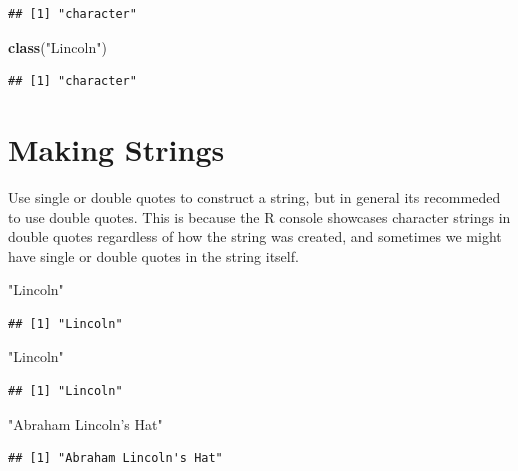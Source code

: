 \documentclass[
]{book}
\newenvironment{Shaded}{\begin{snugshade}}{\end{snugshade}}
\newcommand{\KeywordTok}[1]{\textcolor[rgb]{0.13,0.29,0.53}{\textbf{#1}}}
\newcommand{\NormalTok}[1]{#1}
\newcommand{\StringTok}[1]{\textcolor[rgb]{0.31,0.60,0.02}{#1}}
\begin{document}
\begin{verbatim}
## [1] "character"
\end{verbatim}

\begin{Shaded}
\begin{Highlighting}[]
\KeywordTok{class}\NormalTok{(}\StringTok{"Lincoln"}\NormalTok{)}
\end{Highlighting}
\end{Shaded}

\begin{verbatim}
## [1] "character"
\end{verbatim}

\hypertarget{making-strings}{%
\section{Making Strings}\label{making-strings}}

Use single or double quotes to construct a string, but in general its recommeded to use double quotes. This is because the R console showcases character strings in double quotes regardless of how the string was created, and sometimes we might have single or double quotes in the string itself.

\begin{Shaded}
\begin{Highlighting}[]
\StringTok{"Lincoln"}
\end{Highlighting}
\end{Shaded}

\begin{verbatim}
## [1] "Lincoln"
\end{verbatim}

\begin{Shaded}
\begin{Highlighting}[]
\StringTok{"Lincoln"}
\end{Highlighting}
\end{Shaded}

\begin{verbatim}
## [1] "Lincoln"
\end{verbatim}

\begin{Shaded}
\begin{Highlighting}[]
\StringTok{"Abraham Lincoln's Hat"}
\end{Highlighting}
\end{Shaded}

\begin{verbatim}
## [1] "Abraham Lincoln's Hat"
\end{verbatim}
\end{document}
